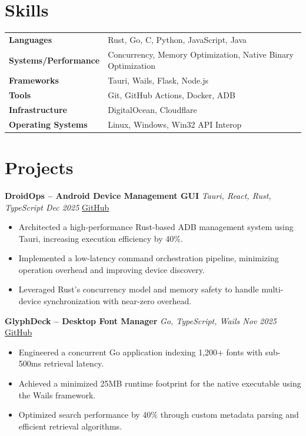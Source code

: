 \documentclass[10pt, a4paper]{article}
\begin{document}
\section*{Skills}

\renewcommand{\arraystretch}{1.05}
\begin{tabular}{@{} >{\bfseries}p{3.8cm} p{13cm} @{}}
Languages           & Rust, Go, C, Python, JavaScript, Java \\
Systems/Performance & Concurrency, Memory Optimization, Native Binary Optimization \\
Frameworks          & Tauri, Wails, Flask, Node.js \\
Tools               & Git, GitHub Actions, Docker, ADB \\
Infrastructure      & DigitalOcean, Cloudflare \\
Operating Systems   & Linux, Windows, Win32 API Interop \\
\end{tabular}

\section*{Projects}

\textbf{DroidOps -- Android Device Management GUI} \hfill \textit{Tauri, React, Rust, TypeScript \quad Dec 2025} \quad \href{https://github.com/bbinxx/droidops}{GitHub}
\begin{itemize}
\item Architected a high-performance Rust-based ADB management system using Tauri, increasing execution efficiency by 40\%.
\item Implemented a low-latency command orchestration pipeline, minimizing operation overhead and improving device discovery.
\item Leveraged Rust's concurrency model and memory safety to handle multi-device synchronization with near-zero overhead.
\end{itemize}

\vspace{3pt}

\textbf{GlyphDeck -- Desktop Font Manager} \hfill \textit{Go, TypeScript, Wails \quad Nov 2025} \quad \href{https://github.com/bbinxx/GlyphDeck}{GitHub}
\begin{itemize}
\item Engineered a concurrent Go application indexing 1,200+ fonts with sub-500ms retrieval latency.
\item Achieved a minimized 25MB runtime footprint for the native executable using the Wails framework.
\item Optimized search performance by 40\% through custom metadata parsing and efficient retrieval algorithms.
\end{itemize}
\end{document}
